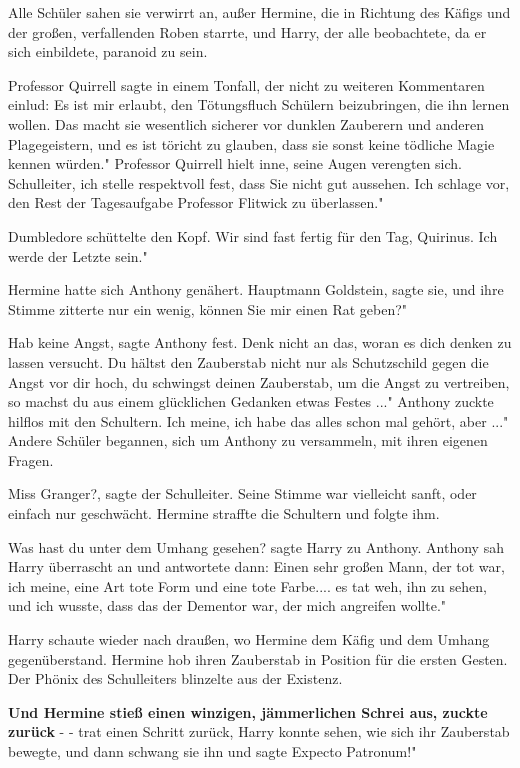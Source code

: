 Alle Schüler sahen sie verwirrt an, außer Hermine, die in Richtung des Käfigs
und der großen, verfallenden Roben starrte, und Harry, der alle beobachtete, da
er sich einbildete, paranoid zu sein.

Professor Quirrell sagte in einem Tonfall, der nicht zu weiteren Kommentaren
einlud: \glqq Es ist mir erlaubt, den Tötungsfluch Schülern beizubringen, die
ihn lernen wollen. Das macht sie wesentlich sicherer vor dunklen Zauberern und
anderen Plagegeistern, und es ist töricht zu glauben, dass sie sonst keine
tödliche Magie kennen würden." Professor Quirrell hielt inne, seine Augen
verengten sich. \glqq Schulleiter, ich stelle respektvoll fest, dass Sie nicht
gut aussehen. Ich schlage vor, den Rest der Tagesaufgabe Professor Flitwick zu
überlassen."

Dumbledore schüttelte den Kopf. \glqq Wir sind fast fertig für den Tag,
Quirinus. Ich werde der Letzte sein."

Hermine hatte sich Anthony genähert. \glqq Hauptmann Goldstein\grqq{}, sagte
sie, und ihre Stimme zitterte nur ein wenig, \glqq können Sie mir einen Rat
geben?"

\glqq Hab keine Angst\grqq{}, sagte Anthony fest. \glqq Denk nicht an das, woran
es dich denken zu lassen versucht. Du hältst den Zauberstab nicht nur als
Schutzschild gegen die Angst vor dir hoch, du schwingst deinen Zauberstab, um
die Angst zu vertreiben, so machst du aus einem glücklichen Gedanken etwas
Festes ..." Anthony zuckte hilflos mit den Schultern. \glqq Ich meine, ich habe
das alles schon mal gehört, aber ..." Andere Schüler begannen, sich um Anthony
zu versammeln, mit ihren eigenen Fragen.

\glqq Miss Granger?\grqq{}, sagte der Schulleiter. Seine Stimme war vielleicht
sanft, oder einfach nur geschwächt. Hermine straffte die Schultern und folgte
ihm.

\glqq Was hast du unter dem Umhang gesehen?\grqq{} sagte Harry zu Anthony.
Anthony sah Harry überrascht an und antwortete dann: \glqq Einen sehr großen
Mann, der tot war, ich meine, eine Art tote Form und eine tote Farbe.... es tat
weh, ihn zu sehen, und ich wusste, dass das der Dementor war, der mich angreifen
wollte."

Harry schaute wieder nach draußen, wo Hermine dem Käfig und dem Umhang
gegenüberstand. Hermine hob ihren Zauberstab in Position für die ersten Gesten.
Der Phönix des Schulleiters blinzelte aus der Existenz.

\textbf{ Und Hermine stieß einen winzigen, jämmerlichen Schrei aus, zuckte
zurück }- - trat einen Schritt zurück, Harry konnte sehen, wie sich ihr
Zauberstab bewegte, und dann schwang sie ihn und sagte \glqq Expecto Patronum!"

